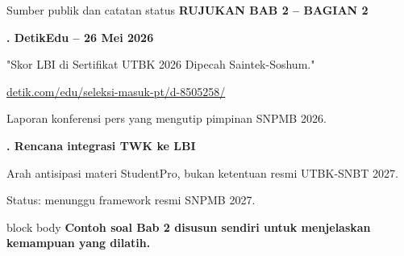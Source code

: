\documentclass[aspectratio=169,11pt]{beamer}
\newcommand{\kicker}[1]{%
  {\color{StudentCyan}\bfseries\fontsize{10.5}{13}\selectfont\MakeUppercase{#1}}\par\vspace{0.11cm}
}
\begin{document}
\begin{frame}{Sumber publik dan catatan status}
  \kicker{Rujukan Bab 2 -- Bagian 2}
  {\color{StudentBlue}\bfseries\fontsize{15}{18}. DetikEdu -- 26 Mei 2026}\par
  \vspace{0.06cm}
  {\fontsize{11}{13.5}\selectfont "Skor LBI di Sertifikat UTBK 2026 Dipecah Saintek-Soshum."}\par
  {\fontsize{10.2}{12.5}\selectfont\href{https://www.detik.com/edu/seleksi-masuk-pt/d-8505258/skor-lbi-di-sertifikat-utbk-2026-dipecah-saintek-soshum-snpmb-jelaskan-mengapa}{detik.com/edu/seleksi-masuk-pt/d-8505258/}}\par
  {\color{StudentGray}\fontsize{10}{12.5}\selectfont Laporan konferensi pers yang mengutip pimpinan SNPMB 2026.}\par
  \vspace{0.24cm}
  {\color{StudentBlue}\bfseries\fontsize{15}{18}. Rencana integrasi TWK ke LBI}\par
  \vspace{0.06cm}
  {\fontsize{11}{13.5}\selectfont Arah antisipasi materi StudentPro, bukan ketentuan resmi UTBK-SNBT 2027.}\par
  {\color{StudentGray}\fontsize{10}{12.5}\selectfont Status: menunggu framework resmi SNPMB 2027.}\par
  \vfill
  \begin{beamercolorbox}[rounded=true,sep=0.14cm,wd=\textwidth]{block body}
    \centering\bfseries Contoh soal Bab 2 disusun sendiri untuk menjelaskan kemampuan yang dilatih.
  \end{beamercolorbox}
\end{frame}
\end{document}
